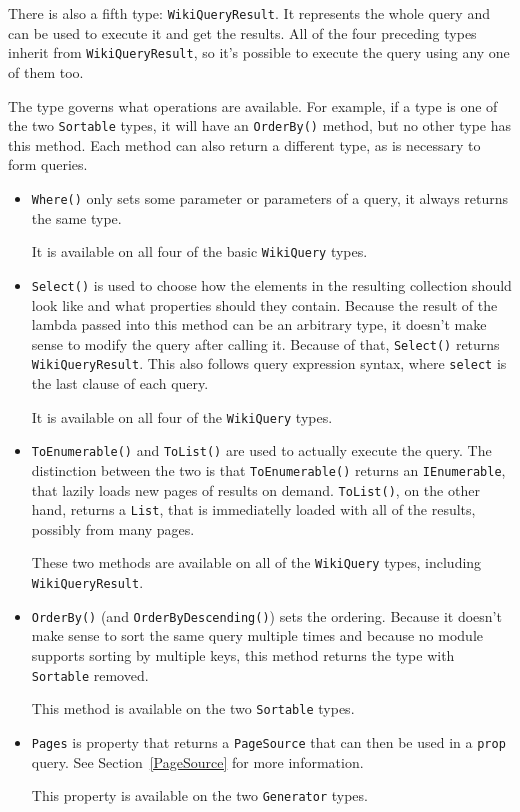 There is also a fifth type: \lstinline{WikiQueryResult}.
It represents the whole query and can be used to execute it and get the results.
All of the four preceding types inherit from \lstinline{WikiQueryResult},
so it's possible  to execute the query using any one of them too.

The type governs what operations are available.
For example, if a type is one of the two \lstinline{Sortable} types,
it will have an \lstinline{OrderBy()} method, but no other type has this method.
Each method can also return a different type, as is necessary to form queries.

\begin{itemize}
\item \lstinline{Where()} only sets some parameter or parameters of a query,
it always returns the same type.

It is available on all four of the basic \lstinline{WikiQuery} types.

\item \lstinline{Select()} is used to choose how the elements in the resulting collection should look like
and what properties should they contain.
Because the result of the lambda passed into this method can be an arbitrary type,
it doesn't make sense to modify the query after calling it.
Because of that, \lstinline{Select()} returns \lstinline{WikiQueryResult}.
This also follows query expression syntax, where \lstinline{select} is the last clause of each query.

It is available on all four of the \lstinline{WikiQuery} types.

\item \lstinline{ToEnumerable()} and \lstinline{ToList()} are used to actually execute the query.
The distinction between the two is that \lstinline{ToEnumerable()} returns an \lstinline{IEnumerable},
that lazily loads new pages of results on demand.
\lstinline{ToList()}, on the other hand, returns a \lstinline{List},
that is immediatelly loaded with all of the results, possibly from many pages.

These two methods are available on all of the \lstinline{WikiQuery} types, including \lstinline{WikiQueryResult}.

\item \lstinline{OrderBy()} (and \lstinline{OrderByDescending()}) sets the ordering.
Because it doesn't make sense to sort the same query multiple times
and because no module supports sorting by multiple keys,
this method returns the type with \lstinline{Sortable} removed.

This method is available on the two \lstinline{Sortable} types.

\item \lstinline{Pages} is property that returns a \lstinline{PageSource}
that can then be used in a \texttt{prop} query.
See Section~\ref{PageSource} for more information.

This property is available on the two \lstinline{Generator} types.

\end{itemize}

